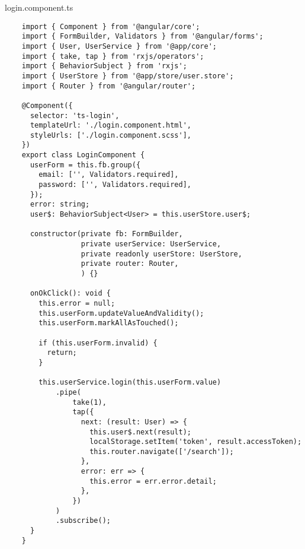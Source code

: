 login.component.ts
\begin{lstlisting}
    import { Component } from '@angular/core';
    import { FormBuilder, Validators } from '@angular/forms';
    import { User, UserService } from '@app/core';
    import { take, tap } from 'rxjs/operators';
    import { BehaviorSubject } from 'rxjs';
    import { UserStore } from '@app/store/user.store';
    import { Router } from '@angular/router';
    
    @Component({
      selector: 'ts-login',
      templateUrl: './login.component.html',
      styleUrls: ['./login.component.scss'],
    })
    export class LoginComponent {
      userForm = this.fb.group({
        email: ['', Validators.required],
        password: ['', Validators.required],
      });
      error: string;
      user$: BehaviorSubject<User> = this.userStore.user$;
    
      constructor(private fb: FormBuilder,
                  private userService: UserService,
                  private readonly userStore: UserStore,
                  private router: Router,
                  ) {}
    
      onOkClick(): void {
        this.error = null;
        this.userForm.updateValueAndValidity();
        this.userForm.markAllAsTouched();
    
        if (this.userForm.invalid) {
          return;
        }
    
        this.userService.login(this.userForm.value)
            .pipe(
                take(1),
                tap({
                  next: (result: User) => {
                    this.user$.next(result);
                    localStorage.setItem('token', result.accessToken);
                    this.router.navigate(['/search']);
                  },
                  error: err => {
                    this.error = err.error.detail;
                  },
                })
            )
            .subscribe();
      }
    }    
\end{lstlisting}

